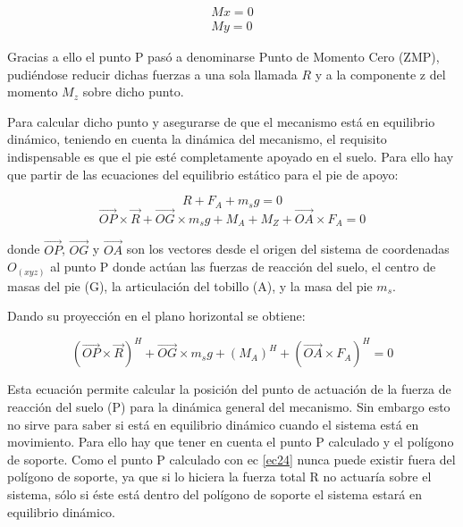 \begin{equation}
\begin{split}
Mx=0\\
My=0
\end{split}
\label{ec21}
\end{equation}

Gracias a ello el punto P pasó a denominarse Punto de Momento Cero (ZMP), pudiéndose reducir dichas fuerzas a una sola llamada $R$ y a la componente z del momento $M_z$ sobre dicho punto.

Para calcular dicho punto y asegurarse de que el mecanismo está en equilibrio dinámico, teniendo en cuenta la dinámica del mecanismo, el requisito indispensable es que el pie esté completamente apoyado en el suelo. Para ello hay que partir de las ecuaciones del equilibrio estático para el pie de apoyo:

\begin{equation}
R+F_A+m_sg=0
\label{ec22}
\end{equation}
\begin{equation}
\overrightarrow{OP} \times \overrightarrow{R}+\overrightarrow{OG} \times m_sg + M_A+M_Z+\overrightarrow{OA} \times F_A=0
\label{ec23}
\end{equation}

donde $\overrightarrow{OP}$, $\overrightarrow{OG}$ y $\overrightarrow{OA}$ son los vectores desde el origen del sistema de coordenadas $O_(xyz)$ al punto P donde actúan las fuerzas de reacción del suelo, el centro de masas del pie (G), la articulación del tobillo (A), y la masa del pie $m_s$.

Dando su proyección en el plano horizontal se obtiene:

\begin{equation}
(\overrightarrow{OP} \times \overrightarrow{R})^H+\overrightarrow{OG} \times m_sg+ (M_A)^H+(\overrightarrow{OA} \times F_A)^H=0 
\label{ec24}
\end{equation}

Esta ecuación permite calcular la posición del punto de actuación de la fuerza de reacción del suelo (P) para la dinámica general del mecanismo. Sin embargo esto no sirve para saber si está en equilibrio dinámico cuando el sistema está en movimiento. Para ello hay que tener en cuenta el punto P calculado y el polígono de soporte. Como el punto P calculado con ec \eqref{ec24} nunca puede existir fuera del polígono de soporte, ya que si lo hiciera la fuerza total R no actuaría sobre el sistema, sólo si éste está dentro del polígono de soporte el sistema estará en equilibrio dinámico.

